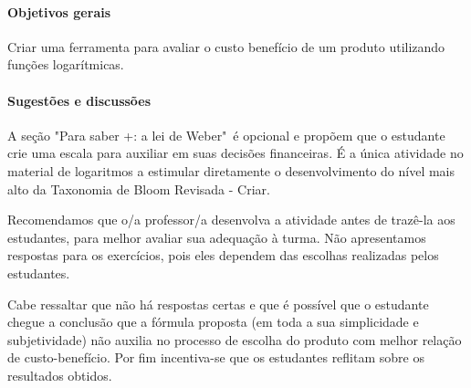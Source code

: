 \begin{texto}
{
	\paragraph{Objetivos gerais}
	Criar uma ferramenta para avaliar o custo benefício de um produto utilizando funções logarítmicas.


	\paragraph{Sugestões e discussões}
	A seção "Para saber +: a lei de Weber"\, é opcional e propõem que o estudante crie uma escala para auxiliar em suas decisões financeiras. É a única atividade no material de logaritmos a estimular diretamente o desenvolvimento do nível mais alto da Taxonomia de Bloom Revisada - Criar.

	Recomendamos que o/a professor/a desenvolva a atividade antes de trazê-la aos estudantes, para  melhor avaliar sua adequação à turma. Não apresentamos respostas para os exercícios, pois eles dependem das escolhas realizadas pelos estudantes.

	Cabe ressaltar que não há respostas certas e que é possível que o estudante chegue a conclusão que a fórmula proposta (em toda a sua simplicidade e subjetividade) não auxilia no processo de escolha do produto com melhor relação de custo-benefício. Por fim incentiva-se que os estudantes reflitam sobre os resultados obtidos.
}
\end{texto}
\clearmargin
